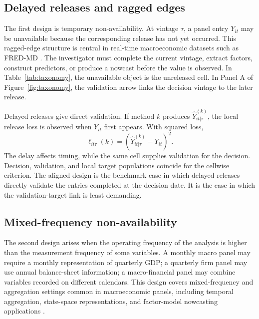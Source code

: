\documentclass[a4paper, 12pt]{article}
\theoremstyle{plain}
\theoremstyle{remark}
\newcommand{\1}{\mathbf{1}}
\begin{document}
\subsection{Delayed releases and ragged edges}

The first design is temporary non-availability. At vintage \(\tau\), a panel entry \(Y_{it}\) may be unavailable because the corresponding release has not yet occurred. This ragged-edge structure is central in real-time macroeconomic datasets such as FRED-MD \citep{McCrackenNg2016}. The investigator must complete the current vintage, extract factors, construct predictors, or produce a nowcast before the value is observed. In Table~\ref{tab:taxonomy}, the unavailable object is the unreleased cell. In Panel A of Figure~\ref{fig:taxonomy}, the validation arrow links the decision vintage to the later release.

Delayed releases give direct validation. If method \(k\) produces \(\widehat Y^{(k)}_{it|\tau}\), the local release loss is observed when \(Y_{it}\) first appears. With squared loss,
\begin{equation*}
  \ell_{it\tau}(k)=\left(\widehat Y^{(k)}_{it|\tau}-Y_{it}\right)^2 .
\end{equation*}
The delay affects timing, while the same cell supplies validation for the decision. Decision, validation, and local target populations coincide for the cellwise criterion. The aligned design is the benchmark case in which delayed releases directly validate the entries completed at the decision date. It is the case in which the validation-target link is least demanding.

\subsection{Mixed-frequency non-availability}

The second design arises when the operating frequency of the analysis is higher than the measurement frequency of some variables. A monthly macro panel may require a monthly representation of quarterly GDP; a quarterly firm panel may use annual balance-sheet information; a macro-financial panel may combine variables recorded on different calendars. This design covers mixed-frequency and aggregation settings common in macroeconomic panels, including temporal aggregation, state-space representations, and factor-model nowcasting applications \citep{MarianoMurasawa2003,BaiGhyselsWright2013,BanburaModugno2014,AnkargrenJoneus2021}.
\end{document}

